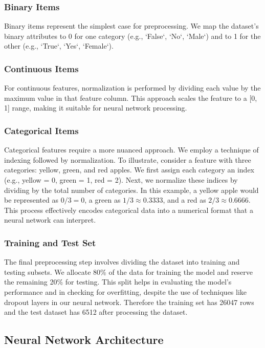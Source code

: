 \documentclass{article}
\begin{document}
\subsubsection{Binary Items}
Binary items represent the simplest case for preprocessing. We map the dataset's binary attributes to 0 for one category (e.g., `False`, `No`, `Male`) and to 1 for the other (e.g., `True`, `Yes`, `Female`).

\subsubsection{Continuous Items}
For continuous features, normalization is performed by dividing each value by the maximum value in that feature column. This approach scales the feature to a [0, 1] range, making it suitable for neural network processing.

\subsubsection{Categorical Items}
Categorical features require a more nuanced approach. We employ a technique of indexing followed by normalization. To illustrate, consider a feature with three categories: yellow, green, and red apples. We first assign each category an index (e.g., yellow = 0, green = 1, red = 2). Next, we normalize these indices by dividing by the total number of categories. In this example, a yellow apple would be represented as $0/3 = 0$, a green as $1/3 \approx 0.3333$, and a red as $2/3 \approx 0.6666$. This process effectively encodes categorical data into a numerical format that a neural network can interpret.

\subsubsection{Training and Test Set}

The final preprocessing step involves dividing the dataset into training and testing subsets. We allocate 80\% of the data for training the model and reserve the remaining 20\% for testing. This split helps in evaluating the model's performance and in checking for overfitting, despite the use of techniques like dropout layers in our neural network. Therefore the training set has 26047 rows and the test dataset has 6512 after processing the dataset.

\subsection{Neural Network Architecture}
\end{document}
